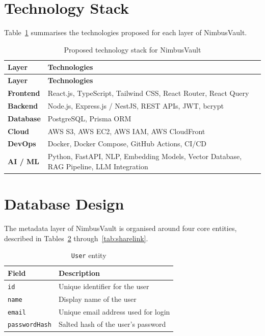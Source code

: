 \documentclass[11pt,a4paper]{article}
\begin{document}
\section{Technology Stack}

Table~\ref{tab:techstack} summarises the technologies proposed for each layer of NimbusVault.

\begin{longtable}{@{}>{\bfseries}p{3.4cm} p{10.6cm}@{}}
\caption{Proposed technology stack for NimbusVault} \label{tab:techstack} \\
\toprule
\textbf{Layer} & \textbf{Technologies} \\
\midrule
\endfirsthead
\toprule
\textbf{Layer} & \textbf{Technologies} \\
\midrule
\endhead
Frontend & React.js, TypeScript, Tailwind CSS, React Router, React Query \\
\midrule
Backend & Node.js, Express.js / NestJS, REST APIs, JWT, bcrypt \\
\midrule
Database & PostgreSQL, Prisma ORM \\
\midrule
Cloud & AWS S3, AWS EC2, AWS IAM, AWS CloudFront \\
\midrule
DevOps & Docker, Docker Compose, GitHub Actions, CI/CD \\
\midrule
AI / ML & Python, FastAPI, NLP, Embedding Models, Vector Database, RAG Pipeline, LLM Integration \\
\bottomrule
\end{longtable}
\section{Database Design}

The metadata layer of NimbusVault is organised around four core entities, described in Tables~\ref{tab:user} through~\ref{tab:sharelink}.

\begin{table}[h!]
\centering
\begin{tabular}{@{}p{3.2cm}p{9.6cm}@{}}
\toprule
\textbf{Field} & \textbf{Description} \\
\midrule
\texttt{id} & Unique identifier for the user \\
\texttt{name} & Display name of the user \\
\texttt{email} & Unique email address used for login \\
\texttt{passwordHash} & Salted hash of the user's password \\
\bottomrule
\end{tabular}
\caption{\texttt{User} entity}
\label{tab:user}
\end{table}
\end{document}
